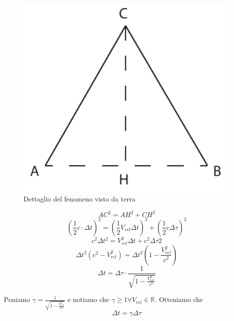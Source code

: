         \begin{figure}[h]
            \caption{Dettaglio del fenomeno visto da terra}
            \centering
            \includegraphics[width=15cm]{res/53reltempo2}
        \end{figure}
        \begin{equation*}
            AC^2=AH^2+CH^2
        \end{equation*}
        \begin{equation*}
            (\frac{1}{2}c\cdot\Delta t)^2 = (\frac{1}{2}V_{rel}\Delta t)^2 + (\frac{1}{2}c\Delta\tau)^2
        \end{equation*}
        \begin{equation*}
            c^2\Delta{t}^2=V_{rel}^2\Delta{t} + c^2\Delta\tau2
        \end{equation*}
        \begin{equation*}
            \Delta{t}^2(c^2-V_{rel}^2) = \Delta{t}^2(1-\frac{V_{rel}^2}{c^2})
        \end{equation*}
        \begin{equation*}
            \Delta{t}=\Delta\tau\cdot\frac{1}{\sqrt{1-\frac{V_{rel}^2}{c^2}}}
        \end{equation*}
        \par Poniamo $\gamma=\frac{1}{\sqrt{1-\frac{V_{rel}^2}{c^2}}}$ e notiamo che $\gamma \geq 1 \forall V_{rel} \in \mathbb{R}$. Otteniamo che
        \begin{equation}\label{eq:53reltempi}
            \Delta{t} = \gamma\Delta\tau
        \end{equation}
